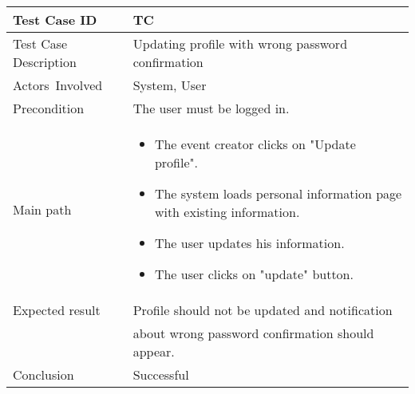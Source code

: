 \begin{center} \begin{tabular}{|l|l|}
  \hline
  Test Case ID & TC \z\\
  \hline
  Test Case Description & Updating profile with wrong password confirmation\\
  \hline
  Actors Involved & System, User\\
   \hline
  Precondition & The user must be logged in.\\
  \hline
  Main path &   \begin{minipage}{5in}
    \vskip 4pt
            \begin{itemize}
              \item The event creator clicks on "Update profile".
              \item The system loads personal information page with existing information.
              \item The user updates his information.
              \item The user clicks on "update" button.
            \end{itemize}
    \vskip 4pt
  \end{minipage}  \\
  \hline
  Expected result & Profile should not be updated and notification\\
  & about wrong password confirmation should appear.\\
  \hline
  Conclusion & Successful\\
  \hline
\end{tabular} \end{center}

